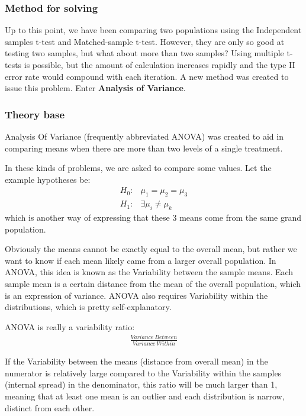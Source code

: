\documentclass[a4paper]{article}
\numberwithin{equation}{section}
\begin{document}
\subsubsection{Method for solving}
Up to this point, we have been comparing two populations using the Independent samples t-test and Matched-sample t-test.
However, they are only so good at testing two samples, but what about more than two samples?
Using multiple t-tests is possible, but the amount of calculation increases rapidly and the type II error rate would compound with each iteration.
A new method was created to issue this problem.
Enter \textbf{Analysis of Variance}.

\subsubsection{Theory base}\label{anovaDef}
Analysis Of Variance (frequently abbreviated ANOVA) was created to aid in comparing means when there are more than two levels of a single treatment.

In these kinds of problems, we are asked to compare some values. Let the example hypotheses be:
\begin{align*}
  H_0: & \mu_1 = \mu_2 = \mu_3    \\
  H_1: & \exists \mu_i \neq \mu_k
\end{align*}
which is another way of expressing that these 3 means come from the same grand population.

Obviously the means cannot be exactly equal to the overall mean, but rather we want to know if each mean likely came from a larger overall population.
In ANOVA, this idea is known as the Variability between the sample means.
Each sample mean is a certain distance from the mean of the overall population, which is an expression of variance.
ANOVA also requires Variability within the distributions, which is pretty self-explanatory.

ANOVA is really a variability ratio:
\begin{align*}
  \frac{Variance\ Between}{Variance\ Within}
\end{align*}

If the Variability between the means (distance from overall mean) in the numerator is relatively large compared to the Variability within the samples (internal spread) in the denominator, this ratio will be much larger than 1, meaning that at least one mean is an outlier and each distribution is narrow, distinct from each other.
\end{document}
